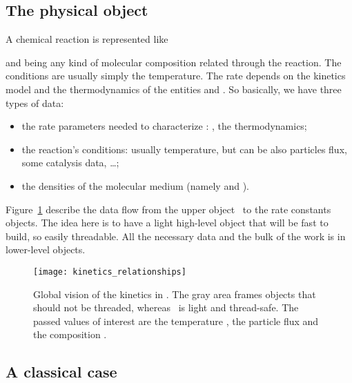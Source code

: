 \subsection{The physical object}

A chemical reaction is represented like
\begin{chemicalEquation}
\end{chemicalEquation}
 and  being any kind of molecular composition
related through the reaction. The conditions are usually
simply the temperature. The rate depends on the kinetics
model and the thermodynamics of the entities  and
. So basically, we have three types of data:
\begin{itemize}
\item the rate parameters needed to characterize \rate: 
                \fwdratecons, the thermodynamics;
\item the reaction's conditions: usually temperature, but can
        be also particles flux, some catalysis data, \dots;
\item the densities of the molecular medium (namely 
        and ).
\end{itemize}


Figure~\ref{kinpf} describe the data flow from the upper
object \KineticsEvaluator\ to the rate constants objects.
The idea here is to have a light high-level object that will
be fast to build, so easily threadable. All the necessary data
and the bulk of the work is in lower-level objects.
%
\begin{figure}
\centering
\texttt{[image: kinetics\_relationships]}
\caption{\label{kinpf}Global vision of the kinetics in \Antioch.
The gray area frames objects that should not be threaded, whereas
\KineticsEvaluator\ is light and thread-safe. The passed values of
interest are the temperature , the
particle flux  and
the composition .}
\end{figure}
%
\subsection{A classical case}

